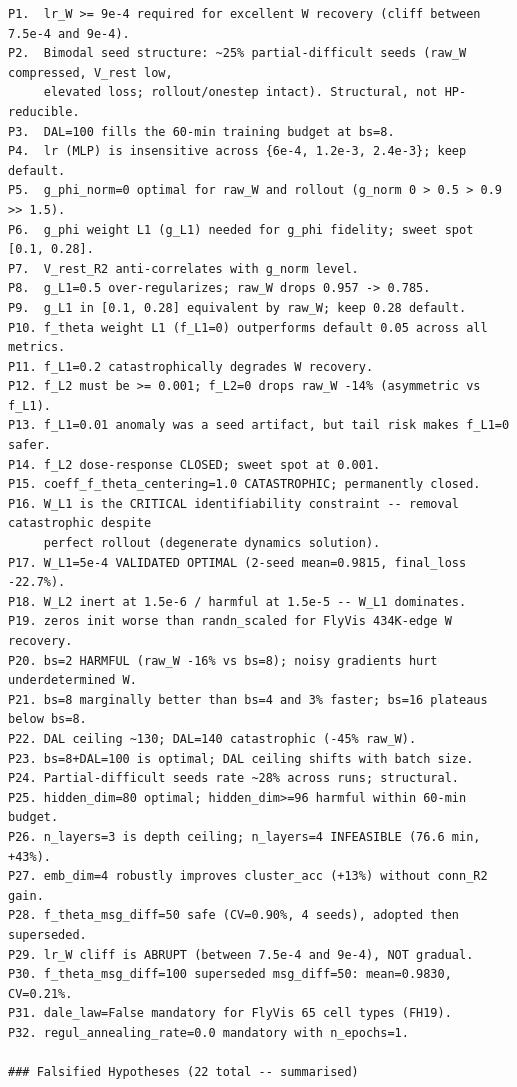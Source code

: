 \begin{tiny}
\begin{verbatim}
P1.  lr_W >= 9e-4 required for excellent W recovery (cliff between 7.5e-4 and 9e-4).
P2.  Bimodal seed structure: ~25% partial-difficult seeds (raw_W compressed, V_rest low,
     elevated loss; rollout/onestep intact). Structural, not HP-reducible.
P3.  DAL=100 fills the 60-min training budget at bs=8.
P4.  lr (MLP) is insensitive across {6e-4, 1.2e-3, 2.4e-3}; keep default.
P5.  g_phi_norm=0 optimal for raw_W and rollout (g_norm 0 > 0.5 > 0.9 >> 1.5).
P6.  g_phi weight L1 (g_L1) needed for g_phi fidelity; sweet spot [0.1, 0.28].
P7.  V_rest_R2 anti-correlates with g_norm level.
P8.  g_L1=0.5 over-regularizes; raw_W drops 0.957 -> 0.785.
P9.  g_L1 in [0.1, 0.28] equivalent by raw_W; keep 0.28 default.
P10. f_theta weight L1 (f_L1=0) outperforms default 0.05 across all metrics.
P11. f_L1=0.2 catastrophically degrades W recovery.
P12. f_L2 must be >= 0.001; f_L2=0 drops raw_W -14% (asymmetric vs f_L1).
P13. f_L1=0.01 anomaly was a seed artifact, but tail risk makes f_L1=0 safer.
P14. f_L2 dose-response CLOSED; sweet spot at 0.001.
P15. coeff_f_theta_centering=1.0 CATASTROPHIC; permanently closed.
P16. W_L1 is the CRITICAL identifiability constraint -- removal catastrophic despite
     perfect rollout (degenerate dynamics solution).
P17. W_L1=5e-4 VALIDATED OPTIMAL (2-seed mean=0.9815, final_loss -22.7%).
P18. W_L2 inert at 1.5e-6 / harmful at 1.5e-5 -- W_L1 dominates.
P19. zeros init worse than randn_scaled for FlyVis 434K-edge W recovery.
P20. bs=2 HARMFUL (raw_W -16% vs bs=8); noisy gradients hurt underdetermined W.
P21. bs=8 marginally better than bs=4 and 3% faster; bs=16 plateaus below bs=8.
P22. DAL ceiling ~130; DAL=140 catastrophic (-45% raw_W).
P23. bs=8+DAL=100 is optimal; DAL ceiling shifts with batch size.
P24. Partial-difficult seeds rate ~28% across runs; structural.
P25. hidden_dim=80 optimal; hidden_dim>=96 harmful within 60-min budget.
P26. n_layers=3 is depth ceiling; n_layers=4 INFEASIBLE (76.6 min, +43%).
P27. emb_dim=4 robustly improves cluster_acc (+13%) without conn_R2 gain.
P28. f_theta_msg_diff=50 safe (CV=0.90%, 4 seeds), adopted then superseded.
P29. lr_W cliff is ABRUPT (between 7.5e-4 and 9e-4), NOT gradual.
P30. f_theta_msg_diff=100 superseded msg_diff=50: mean=0.9830, CV=0.21%.
P31. dale_law=False mandatory for FlyVis 65 cell types (FH19).
P32. regul_annealing_rate=0.0 mandatory with n_epochs=1.

### Falsified Hypotheses (22 total -- summarised)


\end{verbatim}
\end{tiny}

